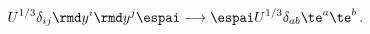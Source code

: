 \begin{equation}
U^{1/3} \delta_{ij} \rmd y^i \rmd y^j \espai \longrightarrow \espai
U^{1/3} \delta_{ab}\te^a \te^b  \,.\label{E8byM8}
\end{equation}


